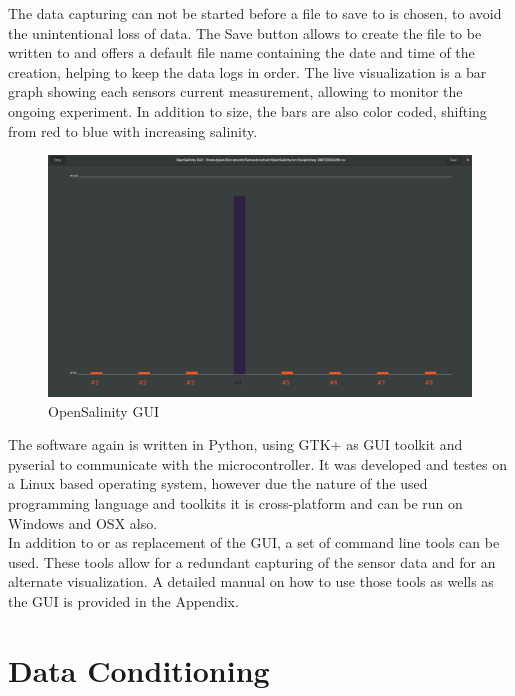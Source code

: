 The data capturing can not be started before a file to save to is chosen, to avoid the unintentional loss of data. The Save button allows to create the file to be written to and offers a default file name containing the date and time of the creation, helping to keep the data logs in order.
The live visualization is a bar graph showing each sensors current measurement, allowing to monitor the ongoing experiment. In addition to size, the bars are also color coded, shifting from red to blue with increasing salinity.\\

\begin{figure}[H]
	\begin{center}
		\includegraphics[width=\textwidth]{images/UI.png}
		\caption{OpenSalinity GUI}
		\label{fig:opamp}
	\end{center}
\end{figure}

The software again is written in Python, using GTK+ as GUI toolkit and pyserial to communicate with the microcontroller. It was developed and testes on a Linux based operating system, however due the nature of the used programming language and toolkits it is cross-platform and can be run on Windows and OSX also.\\

In addition to or as replacement of the GUI, a set of command line tools can be used. These tools allow for a redundant capturing of the sensor data and for an alternate visualization. A detailed manual on how to use those tools as wells as the GUI is provided in the Appendix.

\section{Data Conditioning}


